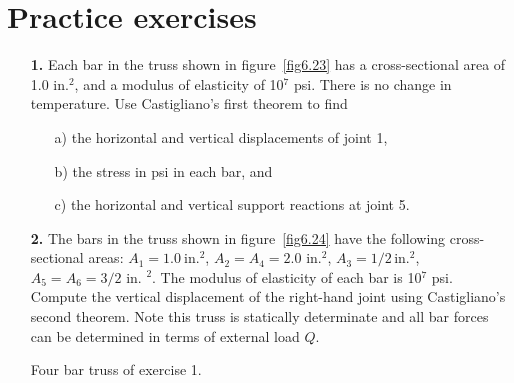 \documentclass{AeroStructure-ERJohnson}
\begin{document}
\vspace*{6pt}

\section{Practice exercises}\label{sec6.6}

\begin{exercise}
\begin{enumerate}[\textbf{2.}]
\item[\textbf{1.}] Each bar in the truss shown in figure~\ref{fig6.23} has a cross-sectional area of 1.0 in.$^2$, and a modulus of elasticity of 10$^7$ psi. There is no change in temperature. Use Castigliano's first theorem to find
\begin{enumerate}[a)]
\item[{\hskip13pt}a)] the horizontal and vertical displacements of joint 1,
\item[{\hskip13pt}b)] the stress in psi in each bar, and
\item[{\hskip13pt}c)] the horizontal and vertical support reactions at joint 5.
\end{enumerate}

\item[\textbf{2.}] The bars in the truss shown in figure~\ref{fig6.24} have the following cross-sectional areas: $A_{1}=1.0~\mathrm{in.}^{2}$, $A_{2}=A_{4}=2.0 \text { in.}^{2}$, $A_{3}=1 / 2\,\mathrm{in.}^{2}$, $A_{5}=A_{6}=3 / 2 \text { in. }^{2}$. The modulus of elasticity of each bar is 10$^7$ psi. Compute the vertical displacement of the right-hand joint using Castigliano's second theorem. Note this truss is statically determinate and all bar forces can be determined in terms of external load $Q$.

{\def\floatbelowskip{-3pt}%
{\caption{Four bar truss of exercise 1.\label{fig6.23}}}
}


\end{enumerate}
\end{exercise}
\end{document}
